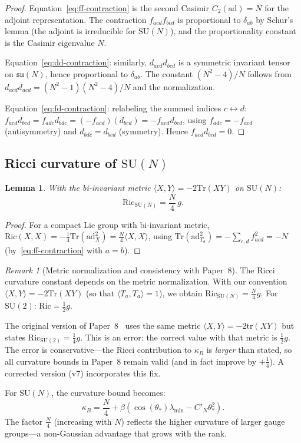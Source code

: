 \documentclass[11pt,a4paper]{article}
\theoremstyle{plain}
\newtheorem{lemma}[theorem]{Lemma}
\theoremstyle{definition}
\theoremstyle{remark}
\newtheorem{remark}[theorem]{Remark}
\newcommand{\SU}{\mathrm{SU}}
\newcommand{\su}{\mathfrak{su}}
\newcommand{\tr}{\mathrm{tr}}
\newcommand{\Tr}{\mathrm{Tr}}
\newcommand{\Ric}{\mathrm{Ric}}
\newcommand{\ad}{\mathrm{ad}}
\newcommand{\ip}[2]{\langle #1, #2 \rangle}
\begin{document}
\begin{proof}
Equation~\eqref{eq:ff-contraction} is the second Casimir
$C_2(\ad) = N$ for the adjoint representation. The contraction
$f_{acd}f_{bcd}$ is proportional to $\delta_{ab}$ by Schur's
lemma (the adjoint is irreducible for $\SU(N)$), and the
proportionality constant is the Casimir eigenvalue $N$.

Equation~\eqref{eq:dd-contraction}: similarly,
$d_{acd}d_{bcd}$ is a symmetric invariant tensor on $\su(N)$,
hence proportional to $\delta_{ab}$. The constant
$(N^2-4)/N$ follows from
$d_{acd}d_{acd} = (N^2 - 1)(N^2-4)/N$ and the normalization.

Equation~\eqref{eq:fd-contraction}: relabeling the summed indices
$c \leftrightarrow d$: $f_{acd}d_{bcd} = f_{adc}d_{bdc}
= (-f_{acd})(d_{bcd}) = -f_{acd}d_{bcd}$, using
$f_{adc} = -f_{acd}$ (antisymmetry) and $d_{bdc} = d_{bcd}$
(symmetry). Hence $f_{acd}d_{bcd} = 0$.
\end{proof}


\subsection{Ricci curvature of $\SU(N)$}

\begin{lemma}\label{lem:ricci-SUN}
With the bi-invariant metric $\ip{X}{Y} = -2\Tr(XY)$ on
$\SU(N)$:
\begin{equation}\label{eq:ricci-SUN}
\Ric_{\SU(N)} = \frac{N}{4}\,g.
\end{equation}
\end{lemma}

\begin{proof}
For a compact Lie group with bi-invariant metric,
$\Ric(X,X) = -\frac{1}{4}\Tr(\ad_X^2)
= \frac{N}{4}\ip{X}{X}$,
using $\Tr(\ad_{T_a}^2) = -\sum_{c,d}f_{acd}^2 = -N$
(by~\eqref{eq:ff-contraction} with $a = b$).
\end{proof}

\begin{remark}[Metric normalization and consistency with Paper~8]\label{rem:normalization}
The Ricci curvature constant depends on the metric normalization.
With our convention $\ip{X}{Y} = -2\Tr(XY)$ (so that
$\ip{T_a}{T_a} = 1$), we obtain
$\Ric_{\SU(N)} = \frac{N}{4}g$. For $\SU(2)$: $\Ric = \frac{1}{2}g$.

The original version of Paper~8~\cite{Fontes2026Paper8} uses the
same metric $\ip{X}{Y} = -2\tr(XY)$ but states
$\Ric_{\SU(2)} = \frac{1}{4}g$. This is an error: the correct
value with that metric is $\frac{1}{2}g$. The error is
conservative---the Ricci contribution to $\kappa_B$ is
\emph{larger} than stated, so all curvature bounds in Paper~8
remain valid (and in fact improve by $+\frac{1}{4}$).
A corrected version (v7) incorporates this fix.

For $\SU(N)$, the curvature bound becomes:
\begin{equation}
\kappa_B = \frac{N}{4}
+ \beta(\cos(\theta_*)\lambda_{\min} - C'_N\theta_*^2).
\end{equation}
The factor $\frac{N}{4}$ (increasing with $N$) reflects the
higher curvature of larger gauge groups---a non-Gaussian advantage
that grows with the rank.
\end{remark}
\end{document}
